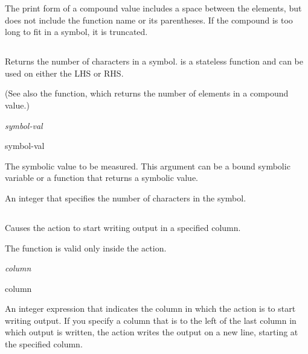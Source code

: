 {{The print form of a compound value includes a space between the
elements, but does not include the function name  or its
parentheses. If the compound is too long to fit in a symbol, it is
truncated.

\subsection{}

Returns the number of characters in a symbol.  is a
stateless function and can be used on either the LHS or RHS.

(See also the  function, which returns the number of
elements in a compound value.)

\Format

 \it{symbol-val}

\begin{arguments}
\item[symbol-val]

  The symbolic value to be measured. This argument can be a bound
  symbolic variable or a function that returns a symbolic value.
\end{arguments}

\ReturnValue

An integer that specifies the number of characters in the symbol.

\subsection{}

Causes the  action to start writing output in a specified
column.

\begin{note}
  The  function is valid only inside the  action.
\end{note}

\Format

 \it{column}

\begin{arguments}
\item[column]

  An integer expression that indicates the column in which the
   action is to start writing output. If you specify a
  column that is to the left of the last column in which output is
  written, the  action writes the output on a new line,
  starting at the specified column.
\end{arguments}

}}
